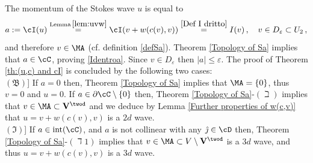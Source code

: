 \documentclass[11pt,a4paper,reqno]{article}
\DeclareMathOperator{\interior}{int}
\numberwithin{equation}{section}
\theoremstyle{definition}
\begin{document}
        The momentum of the Stokes wave $ u $ is  equal to 
        $$
        a :=\cI( u) \stackrel{\text{Lemma} \, \ref{lem:uvw}}= \cI (v + w(c(v),v)) \stackrel{ \eqref{Def I dritto}} = I( v)
        \, , \quad v\in 
        D_\varepsilon   \subset U_2 \, , 
        $$ 
        and therefore 
        $ v\in  \MA $ 
         (cf.  definition \eqref{defSa}).
        Theorem \ref{Topology of Sa} implies that  $a\in \cC$, proving \eqref{Identroa}. 
        Since  $v\in D_\varepsilon$ then  $|a|\leq \varepsilon$.
        The proof of Theorem \ref{th:(u,c) and cI} is concluded  by  the following two cases:
        \\[1mm]
    $(\mathfrak{B})$] If $a=0$ then,  Theorem \ref{Topology of Sa} implies that  $\MA=\{0\}$,  thus $ v=0$ and $ u=0$.
            If $a\in \partial \cC\setminus\{0\}$ then,  Theorem \ref{Topology of Sa}-$(\beth)$ implies that   $ v\in \MA\subset {\bf V}^{\twod}$
            and we deduce by  
Lemma \ref{Further properties of w(c,v)}
 that 
$ u = v + w(c(v),v)$ is a $2d$ wave.
    \\[1mm]
    $(\mathfrak{I})$] If $a\in \interior(\cC)$,  and $ a $ is not collinear with  any $\hat\jmath \in \cD$ then,   Theorem \ref{Topology of Sa}-$(\daleth 1)$ implies that  $ v\in \MA\subset V\setminus {\bf V}^{\twod}$ is a $ 3 d$ wave, and thus $ u = v + w(c(v),v)$ is a $3d$ wave.
           
\end{document}
